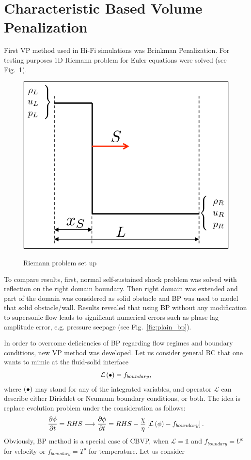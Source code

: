 \section{Characteristic Based Volume Penalization}
First VP method used in Hi-Fi simulations was Brinkman Penalization. For testing purposes 1D Riemann problem for Euler equations were solved (see Fig.~\ref{fig:riemann_euler}).
\begin{figure}[h!]
\centering \includegraphics[scale=0.5]{fig/Riemann_Euler.pdf}\\
\caption{Riemann problem set up \label{fig:riemann_euler}}
\end{figure}

To compare results, first, normal self-sustained shock problem was solved with reflection on the right domain boundary. Then right domain was extended and part of the domain was considered as solid obstacle and BP was used to model that solid obstacle/wall. Results revealed that using BP without any modification to supersonic flow leads to significant numerical errors such as phase lag amplitude error, e.g. pressure seepage (see Fig.~\ref{fig:plain_bp}).

In order to overcome deficiencies of BP regarding flow regimes and boundary conditions, new VP method was developed. Let us consider general BC that one wants to mimic at the fluid-solid interface
\begin{align}
\mathcal L \left(\bullet\right) = f_{boundary},
\end{align}
where $\left(\bullet\right)$ may stand for any of the integrated variables, and operator $\mathcal L$ can describe either Dirichlet or Neumann boundary conditions, or both. The idea is replace evolution problem under the consideration as follows:
\begin{align}
\frac {\partial \phi}{\partial t} = RHS \longrightarrow \frac {\partial \phi}{\partial t} = RHS - \frac \chi \eta \left[\mathcal L \left(\phi\right) - f_{boundary}\right].
\end{align}
Obviously, BP method is a special case of CBVP, when $\mathcal L = \mathds 1$ and $f_{boundary} = U^o$ for velocity or $f_{boundary} = T^o$ for temperature. Let us consider 
